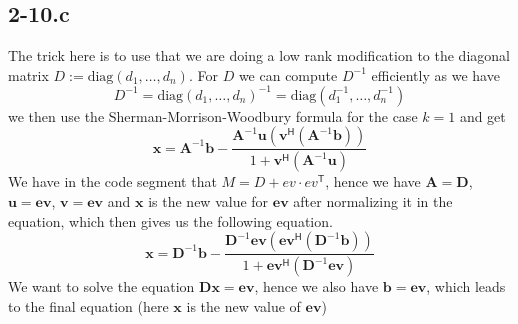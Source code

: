 \documentclass{article}
\begin{document}
\subsection*{2-10.c}
The trick here is to use that we are doing a low rank modification to the diagonal matrix $D := \text{diag}\left(d_{1}, \dots, d_{n}\right)$. For $D$ we can compute $D^{-1}$ efficiently as we have
\begin{equation*}
    D^{-1}= \text{diag}\left(d_{1}, \dots, d_{n}\right)^{-1} =  \text{diag}\left(d_{1}^{-1}, \dots, d_{n}^{-1}\right)
\end{equation*}
we then use the Sherman-Morrison-Woodbury formula for the case $k=1$ and get
\begin{equation*}
    \mathbf{x} = \mathbf{A}^{-1}\mathbf{b} - \frac{\mathbf{A}^{-1}\mathbf{u}\left(\mathbf{v}^{\mathsf{H}}\left( \mathbf{A}^{-1}\mathbf{b}\right)\right)}{1 + \mathbf{v}^{\mathsf{H}}\left(\mathbf{A}^{-1}\mathbf{u}\right)}
\end{equation*}
We have in the code segment that $M = D + ev \cdot ev^{\mathsf{T}}$, hence we have $\mathbf{A} = \mathbf{D}$, $\mathbf{u} = \mathbf{ev}$, $\mathbf{v} = \mathbf{ev}$ and $\mathbf{x}$ is the new value for $\mathbf{ev}$ after normalizing it in the equation, which then gives us the following equation.
\begin{equation*}
    \mathbf{x} = \mathbf{D}^{-1}\mathbf{b} - \frac{\mathbf{D}^{-1}\mathbf{ev}\left(\mathbf{ev}^{\mathsf{H}}\left( \mathbf{D}^{-1}\mathbf{b}\right)\right)}{1 + \mathbf{ev}^{\mathsf{H}}\left(\mathbf{D}^{-1}\mathbf{ev}\right)}
\end{equation*}
We want to solve the equation $\mathbf{D}\mathbf{x} = \mathbf{ev}$, hence we also have $\mathbf{b} = \mathbf{ev}$, which leads to the final equation (here $\mathbf{x}$ is the new value of $\mathbf{ev}$)
\end{document}
